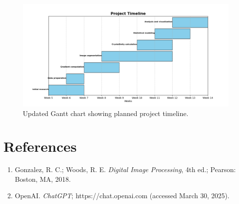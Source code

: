 \documentclass[12pt]{article}
\begin{document}
\begin{figure}[h!]
    \centering
    \includegraphics[width=\textwidth]{gantt_chart.png}
    \caption{Updated Gantt chart showing planned project timeline.}
\end{figure}

\section{References}

\begin{enumerate}
    \item Gonzalez, R. C.; Woods, R. E. \textit{Digital Image Processing}, 4th ed.; Pearson: Boston, MA, 2018.
    \item OpenAI. \textit{ChatGPT}; https://chat.openai.com (accessed March 30, 2025).
\end{enumerate}
\end{document}
